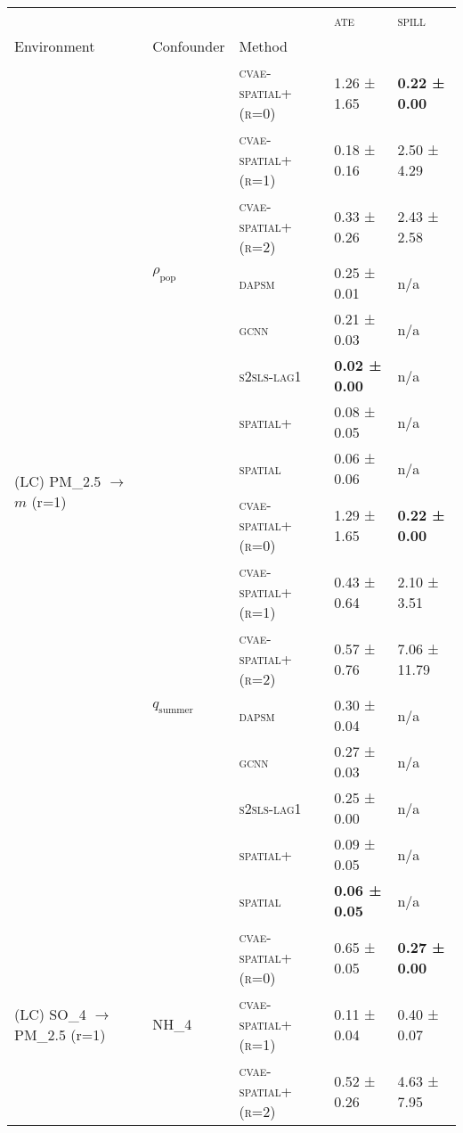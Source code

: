 \documentclass{article}
\begin{document}
\scriptsize
\begin{table}[!tbp]
\centering
\begin{tabular}{lllll}
\toprule
 &  &  & \textsc{ate} & \textsc{spill} \\
Environment & Confounder & Method &  &  \\
\midrule
\multirow[t]{16}{*}{(LC) PM_{2.5} $\to$ $m$ (r=1)} & \multirow[t]{8}{*}{$\rho_{\text{pop}}$} & \textsc{cvae-spatial+ (r=0)} & 1.26 ± {\small 1.65} & \bf 0.22 ± {\small 0.00} \\
 &  & \textsc{cvae-spatial+ (r=1)} & 0.18 ± {\small 0.16} & 2.50 ± {\small 4.29} \\
 &  & \textsc{cvae-spatial+ (r=2)} & 0.33 ± {\small 0.26} & 2.43 ± {\small 2.58} \\
 &  & \textsc{dapsm} & 0.25 ± {\small 0.01} & n/a \\
 &  & \textsc{gcnn} & 0.21 ± {\small 0.03} & n/a \\
 &  & \textsc{s2sls-lag1} & \bf 0.02 ± {\small 0.00} & n/a \\
 &  & \textsc{spatial+} & 0.08 ± {\small 0.05} & n/a \\
 &  & \textsc{spatial} & 0.06 ± {\small 0.06} & n/a \\
\cline{2-5}
 & \multirow[t]{8}{*}{$q_{\text{summer}}$} & \textsc{cvae-spatial+ (r=0)} & 1.29 ± {\small 1.65} & \bf 0.22 ± {\small 0.00} \\
 &  & \textsc{cvae-spatial+ (r=1)} & 0.43 ± {\small 0.64} & 2.10 ± {\small 3.51} \\
 &  & \textsc{cvae-spatial+ (r=2)} & 0.57 ± {\small 0.76} & 7.06 ± {\small 11.79} \\
 &  & \textsc{dapsm} & 0.30 ± {\small 0.04} & n/a \\
 &  & \textsc{gcnn} & 0.27 ± {\small 0.03} & n/a \\
 &  & \textsc{s2sls-lag1} & 0.25 ± {\small 0.00} & n/a \\
 &  & \textsc{spatial+} & 0.09 ± {\small 0.05} & n/a \\
 &  & \textsc{spatial} & \bf 0.06 ± {\small 0.05} & n/a \\
\cline{1-5} \cline{2-5}
\multirow[t]{16}{*}{(LC) SO_{4} $\to$ PM_{2.5} (r=1)} & \multirow[t]{8}{*}{NH_4} & \textsc{cvae-spatial+ (r=0)} & 0.65 ± {\small 0.05} & \bf 0.27 ± {\small 0.00} \\
 &  & \textsc{cvae-spatial+ (r=1)} & 0.11 ± {\small 0.04} & 0.40 ± {\small 0.07} \\
 &  & \textsc{cvae-spatial+ (r=2)} & 0.52 ± {\small 0.26} & 4.63 ± {\small 7.95} \\

\end{tabular}
\end{table}
\end{document}
